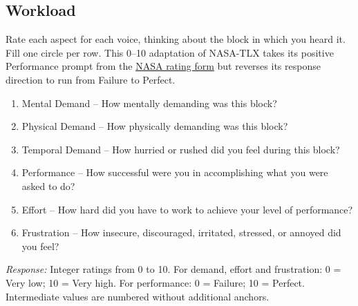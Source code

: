 \subsection{Workload}
Rate each aspect for each voice, thinking about the block in which you heard it. Fill one circle per row. This 0--10 adaptation of NASA-TLX takes its positive Performance prompt from the \href{https://human-factors.arc.nasa.gov/groups/TLX/downloads/TLXScale.pdf}{NASA rating form} but reverses its response direction to run from Failure to Perfect.
\begin{enumerate}
\item \begin{minipage}[t]{\linewidth}
Mental Demand -- How mentally demanding was this block?
\end{minipage}
\item \begin{minipage}[t]{\linewidth}
Physical Demand -- How physically demanding was this block?
\end{minipage}
\item \begin{minipage}[t]{\linewidth}
Temporal Demand -- How hurried or rushed did you feel during this block?
\end{minipage}
\item \begin{minipage}[t]{\linewidth}
Performance -- How successful were you in accomplishing what you were asked to do?
\end{minipage}
\item \begin{minipage}[t]{\linewidth}
Effort -- How hard did you have to work to achieve your level of performance?
\end{minipage}
\item \begin{minipage}[t]{\linewidth}
Frustration -- How insecure, discouraged, irritated, stressed, or annoyed did you feel?
\end{minipage}
\end{enumerate}
\textit{Response:} Integer ratings from 0 to 10. For demand, effort and frustration: 0 = Very low; 10 = Very high. For performance: 0 = Failure; 10 = Perfect. Intermediate values are numbered without additional anchors.
